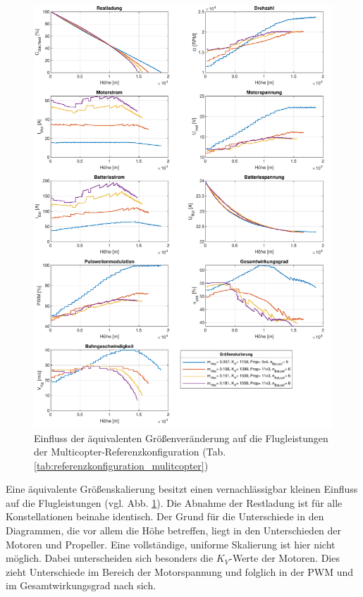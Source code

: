 \begin{figure}[H]
	\includegraphics[scale=0.7]{Diagramme/Groessenskalierung.pdf}
	\caption{Einfluss der äquivalenten Größenveränderung auf die Flugleistungen der Multicopter-Referenzkonfiguration (Tab. \ref{tab:referenzkonfiguration_mulitcopter})}
	\label{abb:groessenskalierung}
\end{figure}
Eine äquivalente Größenskalierung besitzt einen vernachlässigbar kleinen Einfluss auf die Flugleistungen (vgl. Abb. \ref{abb:groessenskalierung}). Die Abnahme der Restladung ist für alle Konstellationen beinahe identisch. Der Grund für die Unterschiede in den Diagrammen, die vor allem die Höhe betreffen, liegt in den Unterschieden der Motoren und Propeller. Eine vollständige, uniforme Skalierung ist hier nicht möglich. Dabei unterscheiden sich besonders die \ensuremath{K_V}-Werte der Motoren. Dies zieht Unterschiede im Bereich der Motorspannung und folglich in der PWM und im Gesamtwirkungsgrad nach sich. \\
